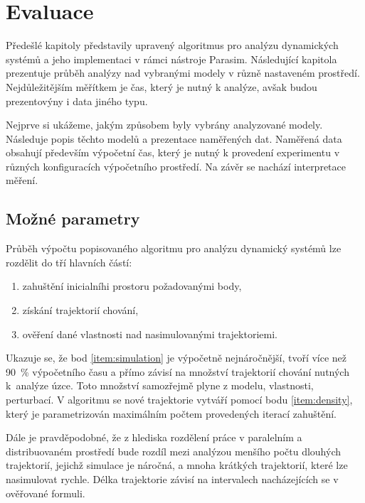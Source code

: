 \chapter{Evaluace}\label{chapter:evaluation}

Předešlé kapitoly představily upravený algoritmus pro analýzu dy\-na\-mic\-kých systémů
a jeho implementaci v rámci nástroje Parasim. Následující kapitola prezentuje průběh 
analýzy nad vybranými modely v různě nastaveném prostředí. Nejdůležitějším měřítkem
je čas, který je nutný k analýze, avšak budou prezentovýny i data jiného typu.


Nejprve si ukážeme, jakým způsobem byly vybrány analyzované modely. Následuje
popis těchto modelů a prezentace naměřených dat. Na\-mě\-ře\-ná data obsahují především
výpočetní čas, který je nutný k provedení experimentu v různých konfiguracích výpočetního
prostředí. Na závěr se nachází interpretace měření.

\section{Možné parametry}

Průběh výpočtu popisovaného algoritmu pro analýzu dynamický systémů lze rozdělit do tří hlavních částí:

\begin{enumerate}
	\item	zahuštění inicialníhi prostoru požadovanými body, \label{item:density}
	\item	získání trajektorií chování,\label{item:simulation}
	\item	ověření dané vlastnosti nad nasimulovanými trajektoriemi. 
\end{enumerate}

Ukazuje se, že bod \ref{item:simulation} je výpočetně nejnáročnější, tvoří více než 90~\% výpočetního času a přímo závisí na 
množství  trajektorií chování nutných k~analýze úzce. Toto množství samozřejmě plyne z modelu, vlastnosti, perturbací.
V algoritmu se nové trajektorie vytváří pomocí bodu \ref{item:density}, který je parametrizován maximálním
počtem provedených iterací zahuštění.

Dále je pravděpodobné, že z hlediska roz\-dě\-le\-ní práce v paralelním a distribuovaném
prostředí bude rozdíl mezi analýzou menšího počtu dlouhých trajektorií, jejichž simulace
je náročná, a mnoha krátkých trajektorií, které lze nasimulovat rychle. Délka trajektorie
závisí na intervalech nacházejících se v ověřované formuli. 

